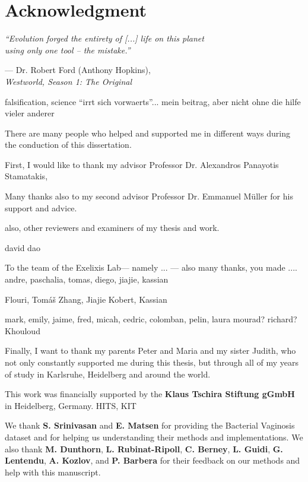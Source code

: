 \section*{Acknowledgment}
\vspace*{1em}

\epigraph
{\textit{``Evolution forged the entirety of [...] life on this planet \\ using only one tool -- the mistake.''}}
{--- Dr. Robert Ford (Anthony Hopkins),\\ \textit{Westworld, Season 1: The Original}}


falsification, science ``irrt sich vorwaerts''... mein beitrag, aber nicht ohne die hilfe vieler anderer


There are many people who helped and supported me in different ways during the conduction of this dissertation.

First, I would like to thank my advisor Professor Dr. Alexandros Panayotis Stamatakis,

Many thanks also to my second advisor Professor Dr. Emmanuel Müller for his support and advice.

also, other reviewers and examiners of my thesis and work.

david dao

To the team of the Exelixis Lab--- namely ... --- also many thanks, you made ....
andre, paschalia, tomas, diego, jiajie, kassian

Flouri, Tom{\'{a}}{\v{s}}
Zhang, Jiajie
Kobert, Kassian

mark, emily, jaime, fred, micah, cedric, colomban, pelin, laura
mourad? richard? Khouloud

Finally, I want to thank my parents Peter and Maria and my sister Judith,
who not only constantly supported me during this thesis,
but through all of my years of study in Karlsruhe, Heidelberg and around the world.


This work was financially supported by the \textbf{Klaus Tschira Stiftung gGmbH} in Heidelberg, Germany.
HITS, KIT

We thank \textbf{S. Srinivasan} and \textbf{E. Matsen}
for providing the Bacterial Vaginosis dataset \cite{Srinivasan2012}
and for helping us understanding their methods and implementations.
We also thank \textbf{M. Dunthorn}, \textbf{L. Rubinat-Ripoll}, \textbf{C. Berney}, \textbf{L. Guidi},
\textbf{G. Lentendu}, %
\textbf{A. Kozlov}, and \textbf{P. Barbera}
for their feedback on our methods and help with this manuscript.

